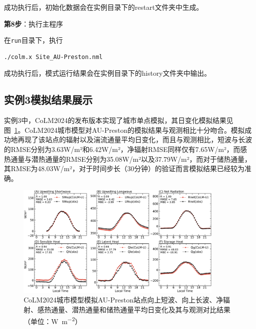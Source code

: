成功执行后，初始化数据会在实例目录下的restart文件夹中生成。

\bigskip
\textbf{第8步}：执行主程序

在\texttt{run}目录下，执行
\begin{lstlisting}
./colm.x Site_AU-Preston.nml
\end{lstlisting}

成功执行后，模式运行结果会在实例目录下的history文件夹中输出。



\subsection{实例3模拟结果展示}

实例3中，CoLM2024的发布版本实现了城市单点模拟，其日变化模拟结果见图~\ref{fig:fig_example03_au}。CoLM2024城市模型对AU-Preston的模拟结果与观测相比十分吻合。模拟成功地再现了该站点的辐射以及湍流通量平均日变化，而且与观测相比，短波与长波的RMSE分别为3.63W/m²和6.42W/m²，净辐射RMSE同样仅有7.65W/m²，而感热通量与潜热通量的RMSE分别为35.08W/m²以及37.79W/m²，而对于储热通量，其RMSE为48.03W/m²，对于时间步长（30分钟）的验证而言模拟结果已经较为准确。

\begin{figure}[htpb]
    \centering
    \includegraphics[width=0.90\textwidth]{figures/Example03_Site_AU-Preston.pdf}
    \caption{CoLM2024城市模型模拟AU-Preston站点向上短波、向上长波、净辐射、感热通量、潜热通量和储热通量平均日变化及其与观测对比结果（单位：\unit{W.m^{-2}}）}
    \label{fig:fig_example03_au}
\end{figure}

